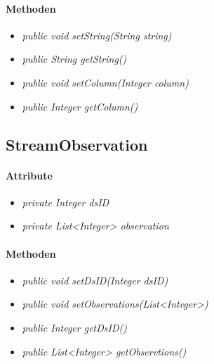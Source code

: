 \paragraph{Methoden}
\begin{itemize}
	\item \textit{public void setString(String string)}
	\item \textit{public String getString()}
	
	\item \textit{public void setColumn(Integer column)}
	\item \textit{public Integer getColumn()}
\end{itemize}

\subsection{StreamObservation}
\paragraph{Attribute} 
\begin{itemize}
	\item \textit{private Integer dsID}
	\item \textit{private List<Integer> observation}
\end{itemize}

\paragraph{Methoden}
\begin{itemize}
	\item \textit{public void setDsID(Integer dsID)}
	\item \textit{public void setObservations(List<Integer>)}
	\item \textit{public Integer getDsID()}
	\item \textit{public List<Integer> getObservtions()}
\end{itemize}
